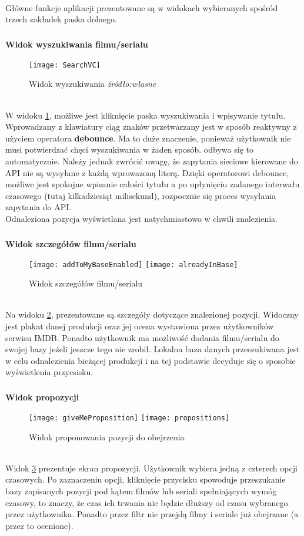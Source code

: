 \documentclass[12pt,oneside,a4paper]{report}
\begin{document}
\paragraph{}Główne funkcje aplikacji prezentowane są w widokach wybieranych spośród trzech zakładek paska dolnego.
\subparagraph{}\textbf{Widok wyszukiwania filmu/serialu}
\begin{figure}[ht!]
	\centering
	\texttt{[image: SearchVC]}
	\caption{Widok wyszukiwania
		\textit{źródło:własne}}
	\label{SearchVC}
\end{figure}\\
W widoku \ref{SearchVC}, możliwe jest kliknięcie paska wyszukiwania i wpisywanie tytułu. Wprowadzany z klawiatury ciąg znaków przetwarzany jest w sposób reaktywny z użyciem operatora \textbf{debounce}. Ma to duże znaczenie, ponieważ użytkownik nie musi potwierdzać chęci wyszukiwania w żaden sposób. odbywa się to automatycznie. Należy jednak zwrócić uwagę, że zapytania sieciowe kierowane do API nie są wysyłane z każdą wprowazoną literą. Dzięki operatorowi debounce, możliwe jest spokojne wpisanie całości tytułu a po upłynięciu zadanego interwału czasowego (tutaj kilkadziesiąt milisekund), rozpocznie się proces wysyłania zapytania do API.\\
Odnaleziona pozycja wyświetlana jest natychmiastowo w chwili znalezienia.
\subparagraph{}\textbf{Widok szczegółów filmu/serialu}
\begin{figure}[ht!]
	\centering
	\subfloat[]{}
	\texttt{[image: addToMyBaseEnabled]}
	\quad
	\subfloat[]{}
	\texttt{[image: alreadyInBase]}
	\caption{Widok szczegółów  filmu/serialu}
	\label{watchableDetails}
\end{figure}\\
Na widoku \ref{watchableDetails}, prezentowane są szczegóły dotyczące znalezionej pozycji. Widoczny jest plakat danej produkcji oraz jej ocena wystawiona przez użytkowników serwisu IMDB. Ponadto użytkownik ma możliwość dodania filmu/serialu do swojej bazy jeżeli jeszcze tego nie zrobił. Lokalna baza danych przeszukiwana jest w celu odnalezienia bieżącej produkcji i na tej podstawie decyduje się o sposobie wyświetlenia przycsisku.
\pagebreak
\subparagraph{}\textbf{Widok propozycji}
\begin{figure}[ht!]
	\centering
	\subfloat[]{}
	\texttt{[image: giveMeProposition]}
	\quad
	\subfloat[]{}
	\texttt{[image: propositions]}
	\caption{Widok proponowania pozycji do obejrzenia}
	\label{proposition}
\end{figure}\\
Widok \ref{proposition} prezentuje ekran propozycji. Użytkownik wybiera jedną z czterech opcji czasowych. Po zaznaczeniu opcji, kliknięcie przycisku spowoduje przeszukanie bazy zapisanych pozycji pod kątem filmów lub seriali spełniających wymóg czasowy, to znaczy, że czas ich trwania nie będzie dłuższy od czasu wybranego przez użytkownika. Ponadto przez filtr nie przejdą filmy i seriale już obejrzane (a przez to ocenione). 
\end{document}
